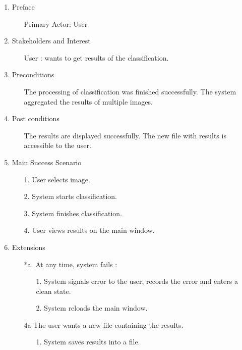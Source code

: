 \documentclass[parskip=full]{scrartcl}
\begin{document}
\begin{enumerate}
	\item Preface
	\begin{itemize} [nosep]
		\item[] Primary Actor: User
	\end{itemize}
	\item Stakeholders and Interest
	\begin{itemize} [nosep]
		\item[] User : wants to get results of the classification.
	\end{itemize}
	\item Preconditions
	\begin{itemize} [nosep]
		\item[] The processing of classification was finished successfully. The system aggregated the results of multiple images.
	\end{itemize}
	\item Post conditions
	\begin{itemize} [nosep]
		\item[] The results are displayed successfully. The new file with results is accessible to the user.
	\end{itemize}
	\item Main Success Scenario
	\begin{itemize} [nosep]
		\item[1.] User selects image.
		\item[2.] System starts classification.
		\item[3.] System finishes classification.
		\item[4.] User views results on the main window. 
	\end{itemize}
	\item Extensions
	\begin{itemize} [nosep]
		\item[*a.] At any time, system fails :
		\begin{itemize} [nosep]
			\item[1.] System signals error to the user, records the error and enters a clean state.
			\item[2.] System reloads the main window.
		\end{itemize}
		\item[4a] The user wants a new file containing the results.
		\begin{itemize} [nosep]
			\item[1.] System saves results into a file.
		\end{itemize}
	\end{itemize}
\end{enumerate}
\end{document}
